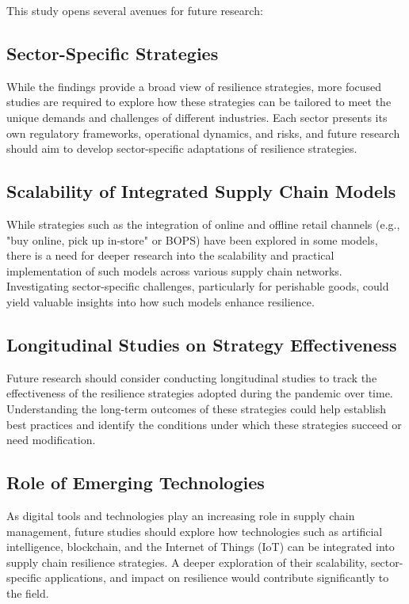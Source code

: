 This study opens several avenues for future research:

\subsection{Sector-Specific Strategies}
While the findings provide a broad view of resilience strategies, more focused studies are required to explore how these strategies can be tailored to meet the unique demands and challenges of different industries. Each sector presents its own regulatory frameworks, operational dynamics, and risks, and future research should aim to develop sector-specific adaptations of resilience strategies.

\subsection{Scalability of Integrated Supply Chain Models}
While strategies such as the integration of online and offline retail channels (e.g., "buy online, pick up in-store" or BOPS) have been explored in some models, there is a need for deeper research into the scalability and practical implementation of such models across various supply chain networks. Investigating sector-specific challenges, particularly for perishable goods, could yield valuable insights into how such models enhance resilience.

\subsection{Longitudinal Studies on Strategy Effectiveness}
Future research should consider conducting longitudinal studies to track the effectiveness of the resilience strategies adopted during the pandemic over time. Understanding the long-term outcomes of these strategies could help establish best practices and identify the conditions under which these strategies succeed or need modification.

\subsection{Role of Emerging Technologies}
As digital tools and technologies play an increasing role in supply chain management, future studies should explore how technologies such as artificial intelligence, blockchain, and the Internet of Things (IoT) can be integrated into supply chain resilience strategies. A deeper exploration of their scalability, sector-specific applications, and impact on resilience would contribute significantly to the field.

